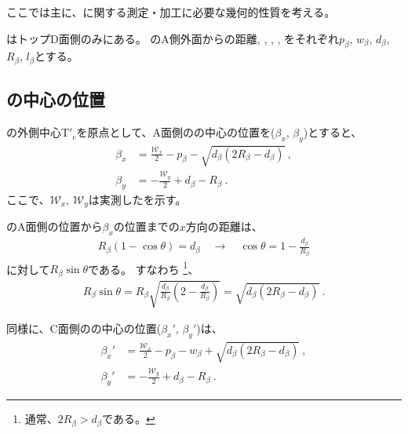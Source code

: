 

ここでは主に、\textbf{\EndFaceBoring}に関する測定・加工に必要な幾何的性質を考える。



\EndFaceBoring はトップD面側のみにある。
\EndFaceBoring のA側外面からの距離, \EndFaceBoringWidth, \EndFaceBoringDepth, \EndFaceBoringCornerR, \EndFaceBoringLength をそれぞれ$p_\beta$, $w_\beta$, $d_\beta$, $R_\beta$, $l_\beta$とする。


\subsection{\EndFaceBoringCornerR の中心の位置}
\TopEndFace の外側中心T$'_\mathrm c$を原点として、A面側の\EndFaceBoringCornerR の中心の位置を($\beta_x$, $\beta_y$)とすると、
\begin{align*}
  \beta_x &= \frac{\mathcal W_x}2-p_\beta-\sqrt{d_\beta(2R_\beta-d_\beta)}\ ,\\
  \beta_y &= -\frac{\mathcal W_y}2+d_\beta-R_\beta\ .
\end{align*}
ここで、$\mathcal W_x$, $\mathcal W_y$は実測した\TopEndFaceBDOD を示す。
\begin{hosoku}
\EndFaceBoring のA面側の位置から$\beta_x$の位置までの$x$方向の距離は、
\begin{align*}
  R_\beta(1-\cos\theta) = d_\beta\quad
  \longrightarrow\quad
  \cos\theta = 1-\frac{d_\beta}{R_\beta}
\end{align*}
に対して$R_\beta\sin\theta$である。
すなわち
\footnote{通常、$2R_\beta > d_\beta$である。}、
\begin{align*}
  R_\beta\sin\theta
  = R_\beta\sqrt{\frac{d_\beta}{R_\beta}\left(2-\frac{d_\beta}{R_\beta}\right)}
  = \sqrt{d_\beta(2R_\beta-d_\beta)}\ .
\end{align*}
\end{hosoku}
同様に、C面側の\EndFaceBoringCornerR の中心の位置($\beta_x'$, $\beta_y'$)は、
\begin{align*}
  \beta_x' &= \frac{\mathcal W_x}2-p_\beta-w_\beta+\sqrt{d_\beta(2R_\beta-d_\beta)}\ ,\\
  \beta_y' &= -\frac{\mathcal W_y}2+d_\beta-R_\beta\ .
\end{align*}


